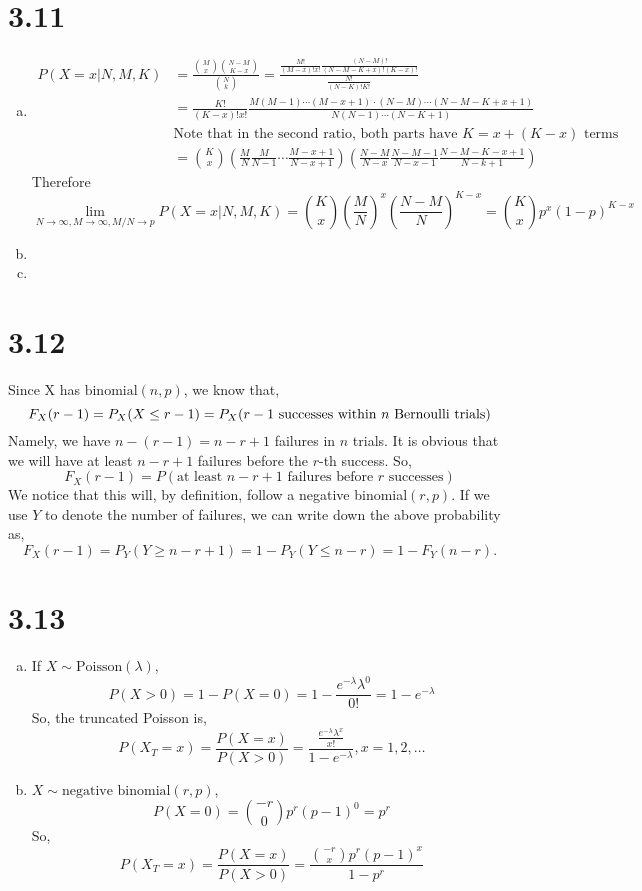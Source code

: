 \documentclass[letter]{article}
\begin{document}
    \section*{3.11}
    \begin{enumerate}[(a)]
    \item 
    \begin{align*}
    P(X=x|N,M,K) & = \frac{\binom{M}{x} \binom{N-M}{K-x}}{\binom{N}{k}} 
    = \frac{\frac{M!}{(M-x)!x!} \frac{(N-M)!}{(N-M-K+x)!(K-x)!}}{\frac{N!}{(N-K)!K!}} \\
    & = \frac{K!}{(K-x)!x!} \frac{M(M-1)\cdots(M-x+1) \cdot (N-M) \cdots (N-M-K+x+1)}{N(N-1)\cdots(N-K+1)}\\
    & \text{Note that in the second ratio, both parts have $K = x + (K-x)$ terms}\\
    & = \binom{K}{x} \left(\frac{M}{N} \frac{M}{N-1} \cdots \frac{M-x+1}{N-x+1} \right) \left(\frac{N-M}{N-x} \frac{N-M-1}{N-x-1} \frac{N-M-K-x+1}{N-k+1} \right)
    \end{align*}
    Therefore
    \[
    \lim_{N \to \infty, M \to \infty, M/N \to p} P(X=x|N,M,K) = \binom{K}{x} \left(\frac{M}{N}\right)^x \left(\frac{N-M}{N}\right)^{K-x} = \binom{K}{x} p^x (1-p)^{K-x}
    \]

    \item 
    \item
    \end{enumerate}
    \section*{3.12}
    Since X has $\text{binomial}(n,p)$, we know that,
    \[
    F_X(r-1) = P_X(X \le r-1) = P_X(\text{$r-1$ successes within $n$ Bernoulli trials}) \\
    \]
    Namely, we have $n-(r-1) = n-r+1$ failures in $n$ trials. It is obvious that we will have at least $n-r+1$ failures before the $r$-th success.
    So,
    \[
    F_X(r-1) = P(\text{at least $n-r+1$ failures before $r$ successes})
    \]
    We notice that this will, by definition, follow a negative binomial$(r, p)$. If we use $Y$ to denote the number of failures, we can write down the above probability as,
    \[
    F_X(r-1) = P_Y(Y \ge n-r+1) = 1 - P_Y(Y \le n-r)  = 1- F_Y(n-r).
    \]
    \section*{3.13}
    \begin{enumerate}[(a)]
    \item If $X \sim \text{Poisson}(\lambda)$, 
    \[
    P(X > 0) = 1 - P(X = 0) = 1 - \frac{e^{-\lambda} \lambda^0}{0!} = 1 - e^{-\lambda}
    \]
    So, the truncated Poisson is,
    \[
    P(X_T = x) = \frac{P(X=x)}{P(X > 0)} = \frac{\frac{e^{-\lambda} \lambda^x}{x!}}{1-e^{-\lambda}}, x = 1, 2, \dots
    \]
    \item $X \sim \text{negative binomial}(r, p)$,
    \[
    P(X = 0) = \binom{-r}{0} p^r(p-1)^0 = p^r
    \]
    So,
    \[
    P(X_T = x) = \frac{P(X=x)}{P(X > 0)} = \frac{\binom{-r}{x} p^r (p-1)^x}{1-p^r}
    \]
    \end{enumerate}
\end{document}
